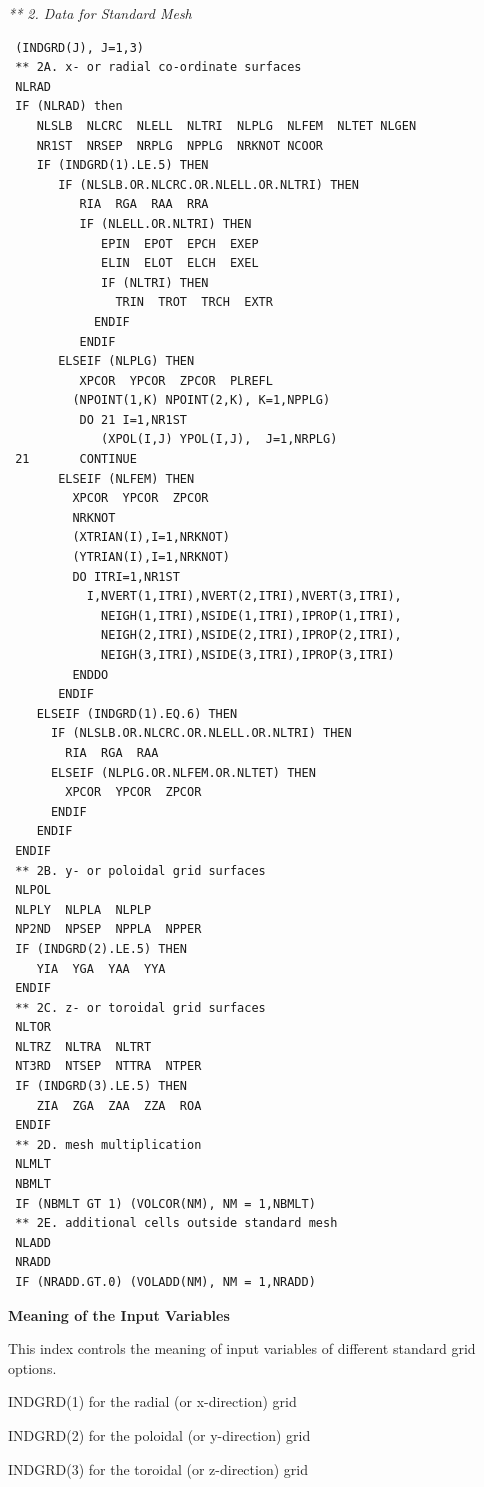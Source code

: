 {\sl *** 2. Data for Standard Mesh}
\begin{verbatim}
 (INDGRD(J), J=1,3)
 ** 2A. x- or radial co-ordinate surfaces
 NLRAD
 IF (NLRAD) then
    NLSLB  NLCRC  NLELL  NLTRI  NLPLG  NLFEM  NLTET NLGEN
    NR1ST  NRSEP  NRPLG  NPPLG  NRKNOT NCOOR
    IF (INDGRD(1).LE.5) THEN
       IF (NLSLB.OR.NLCRC.OR.NLELL.OR.NLTRI) THEN
          RIA  RGA  RAA  RRA
          IF (NLELL.OR.NLTRI) THEN
             EPIN  EPOT  EPCH  EXEP
             ELIN  ELOT  ELCH  EXEL
             IF (NLTRI) THEN
               TRIN  TROT  TRCH  EXTR
            ENDIF
          ENDIF
       ELSEIF (NLPLG) THEN
          XPCOR  YPCOR  ZPCOR  PLREFL
         (NPOINT(1,K) NPOINT(2,K), K=1,NPPLG)
          DO 21 I=1,NR1ST
             (XPOL(I,J) YPOL(I,J),  J=1,NRPLG)
 21       CONTINUE
       ELSEIF (NLFEM) THEN
         XPCOR  YPCOR  ZPCOR
         NRKNOT
         (XTRIAN(I),I=1,NRKNOT)
         (YTRIAN(I),I=1,NRKNOT)
         DO ITRI=1,NR1ST
           I,NVERT(1,ITRI),NVERT(2,ITRI),NVERT(3,ITRI),
             NEIGH(1,ITRI),NSIDE(1,ITRI),IPROP(1,ITRI),
             NEIGH(2,ITRI),NSIDE(2,ITRI),IPROP(2,ITRI),
             NEIGH(3,ITRI),NSIDE(3,ITRI),IPROP(3,ITRI)
         ENDDO
       ENDIF
    ELSEIF (INDGRD(1).EQ.6) THEN
      IF (NLSLB.OR.NLCRC.OR.NLELL.OR.NLTRI) THEN
        RIA  RGA  RAA
      ELSEIF (NLPLG.OR.NLFEM.OR.NLTET) THEN
        XPCOR  YPCOR  ZPCOR
      ENDIF
    ENDIF
 ENDIF
 ** 2B. y- or poloidal grid surfaces
 NLPOL
 NLPLY  NLPLA  NLPLP
 NP2ND  NPSEP  NPPLA  NPPER
 IF (INDGRD(2).LE.5) THEN
    YIA  YGA  YAA  YYA
 ENDIF
 ** 2C. z- or toroidal grid surfaces
 NLTOR
 NLTRZ  NLTRA  NLTRT
 NT3RD  NTSEP  NTTRA  NTPER
 IF (INDGRD(3).LE.5) THEN
    ZIA  ZGA  ZAA  ZZA  ROA
 ENDIF
 ** 2D. mesh multiplication
 NLMLT
 NBMLT
 IF (NBMLT GT 1) (VOLCOR(NM), NM = 1,NBMLT)
 ** 2E. additional cells outside standard mesh
 NLADD
 NRADD
 IF (NRADD.GT.0) (VOLADD(NM), NM = 1,NRADD)
\end{verbatim}

\medskip

\noindent

{\bf Meaning of the Input Variables}

\medskip

\noindent

\begin{list}{ }{}
\item[{\bf INDGRD }]
This index controls the meaning of input variables of different
standard grid options.

INDGRD(1)  for the radial (or x-direction) grid

INDGRD(2)  for the poloidal (or y-direction) grid

INDGRD(3)  for the toroidal (or z-direction) grid
\end{list}

